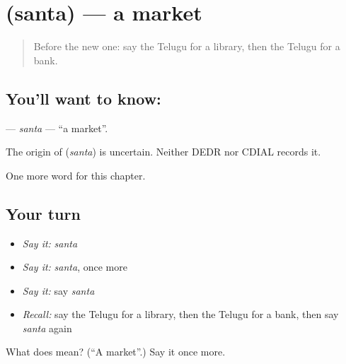 \section[\texorpdfstring{\te{సంత} (santa)}{సంత (santa)}]{ (santa) — a market}

\label{lesson:TE-C103-santa}



\begin{quote}
Before the new one: say the Telugu for a library, then the Telugu for a bank.
\end{quote}

\subsection*{You'll want to know: }
\textbf{} — \emph{santa} — \textquotedblleft{}a market\textquotedblright{}.

\begin{cousinweb}
The origin of \textbf{} (\emph{santa}) is uncertain. Neither DEDR nor CDIAL records it.
\end{cousinweb}

\begin{grammarlens}[title={What you've built}]
One more word for this chapter.
\end{grammarlens}

\subsection*{Your turn}
\begin{itemize}
\raggedright
  \item \emph{Say it:} \emph{santa}
  \item \emph{Say it:} \emph{santa}, once more
  \item \emph{Say it:} say \emph{santa}
  \item \emph{Recall:} say the Telugu for a library, then the Telugu for a bank, then say \emph{santa} again
\end{itemize}

\begin{tcolorbox}[breakable,colback=teal!4,colframe=teal!35!black,title={Before you move on}]
What does  mean? (\textquotedblleft{}A market\textquotedblright{}.) Say it once more.
\end{tcolorbox}
